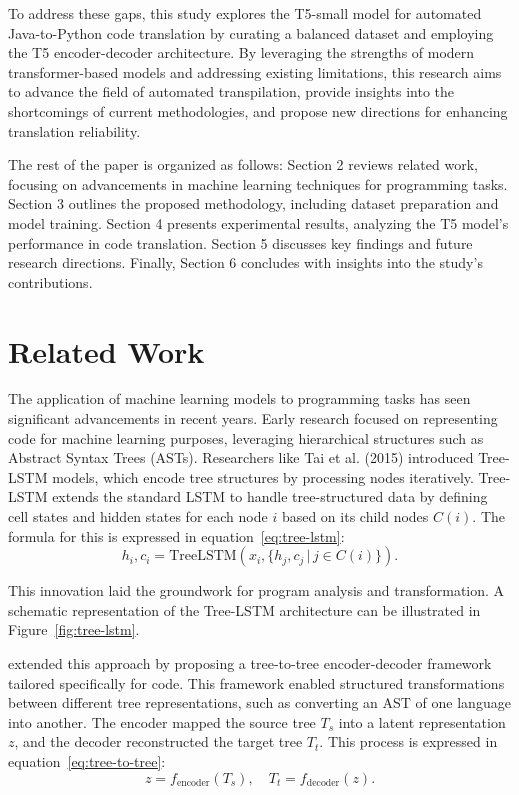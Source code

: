 \documentclass{dhbenelux}
\begin{document}
To address these gaps, this study explores the T5-small model for automated Java-to-Python code translation by curating a balanced dataset and employing the T5 encoder-decoder architecture. By leveraging the strengths of modern transformer-based models and addressing existing limitations, this research aims to advance the field of automated transpilation, provide insights into the shortcomings of current methodologies, and propose new directions for enhancing translation reliability.

The rest of the paper is organized as follows: Section 2 reviews related work, focusing on advancements in machine learning techniques for programming tasks. Section 3 outlines the proposed methodology, including dataset preparation and model training. Section 4 presents experimental results, analyzing the T5 model's performance in code translation. Section 5 discusses key findings and future research directions. Finally, Section 6 concludes with insights into the study's contributions.


\section{Related Work}

The application of machine learning models to programming tasks has seen significant advancements in recent years. Early research focused on representing code for machine learning purposes, leveraging hierarchical structures such as Abstract Syntax Trees (ASTs). Researchers like Tai et al. (2015) \cite{tai2015} introduced Tree-LSTM models, which encode tree structures by processing nodes iteratively. Tree-LSTM extends the standard LSTM to handle tree-structured data by defining cell states and hidden states for each node \( i \) based on its child nodes \( C(i) \). The formula for this is expressed in equation~\ref{eq:tree-lstm}:
\begin{equation}
h_i, c_i = \text{TreeLSTM}(x_i, \{h_{j}, c_{j} \,|\, j \in C(i)\}).
\label{eq:tree-lstm}
\end{equation}

This innovation laid the groundwork for program analysis and transformation. A schematic representation of the Tree-LSTM architecture can be illustrated in Figure~\ref{fig:tree-lstm}.



\cite{chen2018} extended this approach by proposing a tree-to-tree encoder-decoder framework tailored specifically for code. This framework enabled structured transformations between different tree representations, such as converting an AST of one language into another. The encoder mapped the source tree \( T_s \) into a latent representation \( z \), and the decoder reconstructed the target tree \( T_t \). This process is expressed in equation~\ref{eq:tree-to-tree}:
\begin{equation}
z = f_{\text{encoder}}(T_s), \quad T_t = f_{\text{decoder}}(z).
\label{eq:tree-to-tree}
\end{equation}
\end{document}
